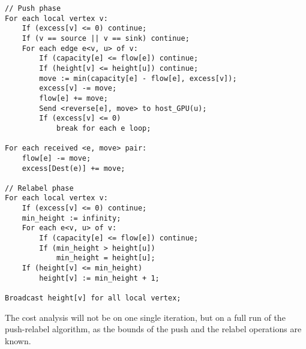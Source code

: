 \documentclass[10pt,oneside]{memoir}
\begin{document}
\begin{verbatim}
// Push phase
For each local vertex v:
    If (excess[v] <= 0) continue;
    If (v == source || v == sink) continue;
    For each edge e<v, u> of v:
        If (capacity[e] <= flow[e]) continue;
        If (height[v] <= height[u]) continue;
        move := min(capacity[e] - flow[e], excess[v]);
        excess[v] -= move;
        flow[e] += move;
        Send <reverse[e], move> to host_GPU(u);
        If (excess[v] <= 0)
            break for each e loop;

For each received <e, move> pair:
    flow[e] -= move;
    excess[Dest(e)] += move;

// Relabel phase
For each local vertex v:
    If (excess[v] <= 0) continue;
    min_height := infinity;
    For each e<v, u> of v:
        If (capacity[e] <= flow[e]) continue;
        If (min_height > height[u])
            min_height = height[u];
    If (height[v] <= min_height)
        height[v] := min_height + 1;

Broadcast height[v] for all local vertex;
\end{verbatim}

The cost analysis will not be on one single iteration, but on a full run
of the push-relabel algorithm, as the bounds of the push and the relabel
operations are known.
\end{document}
